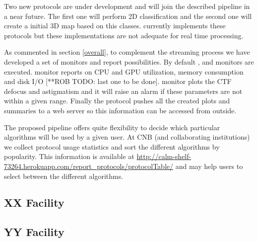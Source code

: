 Two new protocols are under development and will join the described  pipeline in a near future. The first one will perform 2D classification and the second one will create a initial 3D map based on this classes. \scipion currently implements these protocols but these implementations are not adequate for real time processing.

As commented in section \ref{overall}, to complement the streaming process we have developed a set of monitors and report possibilities. By default ,  and  monitors are executed.  monitor reports on  CPU and GPU utilization, memory consumption and disk I/O [**ROB TODO: last one to be done].  monitor plots the CTF defocus and astigmatism  and it will raise an alarm if these parameters are not within a given range. Finally the  protocol pushes all the created plots and summaries to a web server 
so this information can be accessed from outside.

The proposed pipeline offers quite flexibility to decide which particular algorithms will be used by a given user. At CNB (and collaborating institutions) we collect protocol usage statistics and sort the different algorithms by popularity.  This information is available at  \url{http://calm-shelf-73264.herokuapp.com/report_protocols/protocolTable/} and may help users to select   between the different algorithms.

\subsection{XX Facility}

\subsection{YY Facility}






